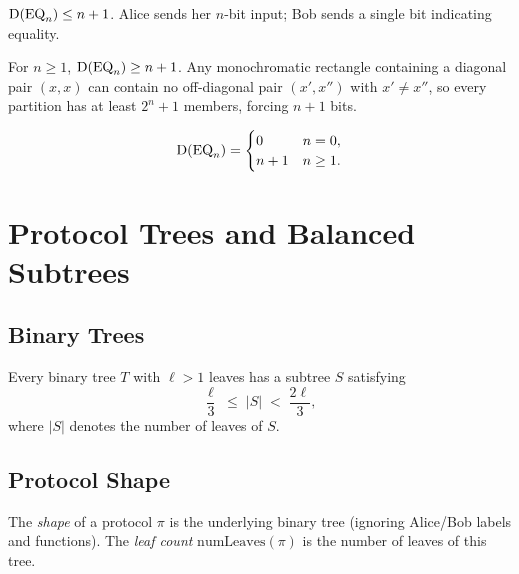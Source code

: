 \begin{theorem}
  \label{thm:eq_upper}
  \leanok
  $\mathrm{D}(\mathrm{EQ}_n) \le n + 1$.  Alice sends her $n$-bit input; Bob sends a single
  bit indicating equality.
\end{theorem}

\begin{theorem}
  \label{thm:eq_lower}
  \leanok
  For $n \ge 1$, $\mathrm{D}(\mathrm{EQ}_n) \ge n + 1$.
  Any monochromatic rectangle containing a diagonal pair $(x,x)$ can contain no
  off-diagonal pair $(x',x'')$ with $x' \ne x''$, so every partition has at least
  $2^n + 1$ members, forcing $n + 1$ bits.
\end{theorem}

\begin{theorem}
  \label{thm:eq_exact}
  \leanok
  \[
    \mathrm{D}(\mathrm{EQ}_n) = \begin{cases} 0 & n = 0, \\ n + 1 & n \ge 1. \end{cases}
  \]
\end{theorem}

\chapter{Protocol Trees and Balanced Subtrees}

\section{Binary Trees}

\begin{lemma}
  \label{lem:balanced_subtree}
  \leanok
  Every binary tree $T$ with $\ell > 1$ leaves has a subtree $S$ satisfying
  \[
    \frac{\ell}{3} \;\le\; |S| \;<\; \frac{2\ell}{3},
  \]
  where $|S|$ denotes the number of leaves of $S$.
\end{lemma}

\section{Protocol Shape}

\begin{definition}
  \label{def:protocol_shape}
  \leanok
  The \emph{shape} of a protocol $\pi$ is the underlying binary tree (ignoring
  Alice/Bob labels and functions).  The \emph{leaf count} $\mathrm{numLeaves}(\pi)$
  is the number of leaves of this tree.
\end{definition}

